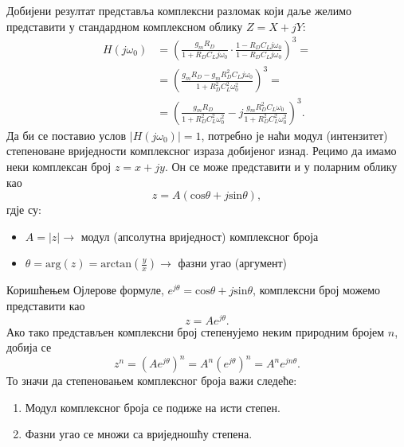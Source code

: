 \documentclass[master]{finthesis}
\begin{document}
Добијени резултат представља комплексни разломак који даље желимо представити у стандардном комплексном облику $Z = X + jY$:
\begin{equation} 
	\label{osc_feedback_eq_11}
	\displaystyle
	\begin{split}
		H(j\omega_{0}) &= \left(\frac{g_{m}R_{D}}{1+R_{D}C_{L}j\omega_{0}}\cdot\frac{1-R_{D}C_{L}j\omega_{0}}{1-R_{D}C_{L}j\omega_{0}}\right)^{3} = \\
			       &= \left(\frac{g_{m}R_{D}-g_{m}R_{D}^{2}C_{L}j\omega_{0}}{1+R_{D}^{2}C_{L}^{2}\omega_{0}^{2}}\right)^{3} = \\
			       &= \left(\frac{g_{m}R_{D}}{1+R_{D}^{2}C_{L}^{2}\omega_{0}^2}-j\frac{g_{m}R_{D}^{2}C_{L}\omega_{0}}{1+R_{D}^{2}C_{L}^{2}\omega_{0}^{2}}\right)^{3}.
	\end{split}
\end{equation}
Да би се поставио услов $|H(j\omega_{0})|=1$, потребно је наћи модул (интензитет) степеноване вриједности комплексног израза добијеног изнад. Рецимо да имамо неки комплексан број $z=x+jy$. Он се може представити и у поларним облику као
\begin{equation}
	\label{compl_1}
	z = A(\text{cos}\theta + j\text{sin}\theta),
\end{equation}
гдје су:
\begin{itemize}
	\item $A = |z| \rightarrow$ модул (апсолутна вриједност) комплексног броја
	\item $\theta = \text{arg}(z) = \displaystyle \text{arctan}\left(\frac{y}{x}\right) \rightarrow$ фазни угао (аргумент)
\end{itemize}
Коришћењем Ојлерове формуле, $e^{j\theta} = \text{cos}\theta + j\text{sin}\theta$, комплексни број можемо представити као
\begin{equation}
	\label{compl_2}
	z = Ae^{j\theta}.
\end{equation}
Ако тако представљен комплексни број степенујемо неким природним бројем $n$, добија се
\begin{equation}
	\label{compl_3}
	z^{n} = \left(Ae^{j\theta}\right)^{n} = A^{n}\left(e^{j\theta}\right)^{n} = A^{n}e^{jn\theta}.
\end{equation}
То значи да степеновањем комплексног броја важи следеће:
\begin{enumerate}
	\item Модул комплексног броја се подиже на исти степен.
	\item Фазни угао се множи са вриједношћу степена.
\end{enumerate}
\end{document}
